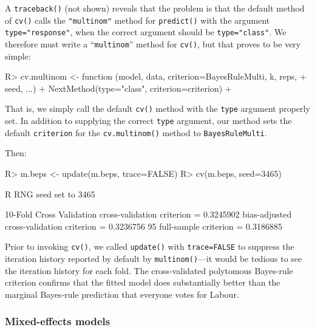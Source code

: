 \documentclass[
]{jss}
\begin{document}
A \texttt{traceback()} (not shown) reveals that the problem is that the
default method of \texttt{cv()} calls the \texttt{"multinom"} method for
\texttt{predict()} with the argument \texttt{type="response"}, when the
correct argument should be \texttt{type="class"}. We therefore must
write a ``\texttt{multinom}'' method for \texttt{cv()}, but that proves
to be very simple:

\begin{CodeChunk}
\begin{CodeInput}
R> cv.multinom <- function (model, data, criterion=BayesRuleMulti, k, reps,
+                          seed, ...){
+   NextMethod(type="class", criterion=criterion)
+ }
\end{CodeInput}
\end{CodeChunk}

That is, we simply call the default \texttt{cv()} method with the
\texttt{type} argument properly set. In addition to supplying the
correct \texttt{type} argument, our method sets the default
\texttt{criterion} for the \texttt{cv.multinom()} method to
\texttt{BayesRuleMulti}.

Then:

\begin{CodeChunk}
\begin{CodeInput}
R> m.beps <- update(m.beps, trace=FALSE)
R> cv(m.beps, seed=3465)
\end{CodeInput}
\begin{CodeOutput}
R RNG seed set to 3465
\end{CodeOutput}
\begin{CodeOutput}
10-Fold Cross Validation
cross-validation criterion = 0.3245902
bias-adjusted cross-validation criterion = 0.3236756
95%
full-sample criterion = 0.3186885 
\end{CodeOutput}
\end{CodeChunk}

Prior to invoking \texttt{cv()}, we called \texttt{update()} with
\texttt{trace=FALSE} to suppress the iteration history reported by
default by \texttt{multinom()}---it would be tedious to see the
iteration history for each fold. The cross-validated polytomous
Bayes-rule criterion confirms that the fitted model does substantially
better than the marginal Bayes-rule prediction that everyone votes for
Labour.

\hypertarget{mixed-effects-models}{%
\subsubsection{Mixed-effects models}\label{mixed-effects-models}}
\end{document}
